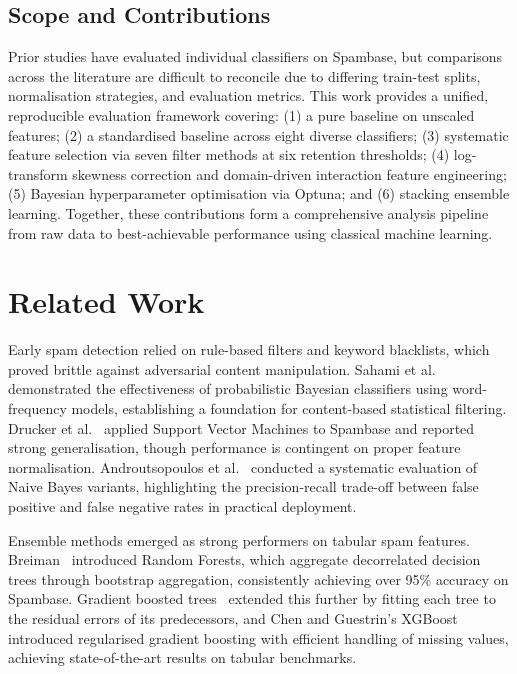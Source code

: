 \documentclass[conference]{IEEEtran}
\begin{document}
\subsection{Scope and Contributions}
Prior studies have evaluated individual classifiers on Spambase, but comparisons across the literature are difficult to reconcile due to differing train-test splits, normalisation strategies, and evaluation metrics. This work provides a unified, reproducible evaluation framework covering: (1) a pure baseline on unscaled features; (2) a standardised baseline across eight diverse classifiers; (3) systematic feature selection via seven filter methods at six retention thresholds; (4) log-transform skewness correction and domain-driven interaction feature engineering; (5) Bayesian hyperparameter optimisation via Optuna; and (6) stacking ensemble learning. Together, these contributions form a comprehensive analysis pipeline from raw data to best-achievable performance using classical machine learning.

\section{Related Work}

Early spam detection relied on rule-based filters and keyword blacklists, which proved brittle against adversarial content manipulation. Sahami et al.~\cite{ref3} demonstrated the effectiveness of probabilistic Bayesian classifiers using word-frequency models, establishing a foundation for content-based statistical filtering. Drucker et al.~\cite{ref4} applied Support Vector Machines to Spambase and reported strong generalisation, though performance is contingent on proper feature normalisation. Androutsopoulos et al.~\cite{ref5} conducted a systematic evaluation of Naive Bayes variants, highlighting the precision-recall trade-off between false positive and false negative rates in practical deployment.

Ensemble methods emerged as strong performers on tabular spam features. Breiman~\cite{ref6} introduced Random Forests, which aggregate decorrelated decision trees through bootstrap aggregation, consistently achieving over 95\% accuracy on Spambase. Gradient boosted trees~\cite{ref10} extended this further by fitting each tree to the residual errors of its predecessors, and Chen and Guestrin's XGBoost~\cite{ref7} introduced regularised gradient boosting with efficient handling of missing values, achieving state-of-the-art results on tabular benchmarks.
\end{document}
